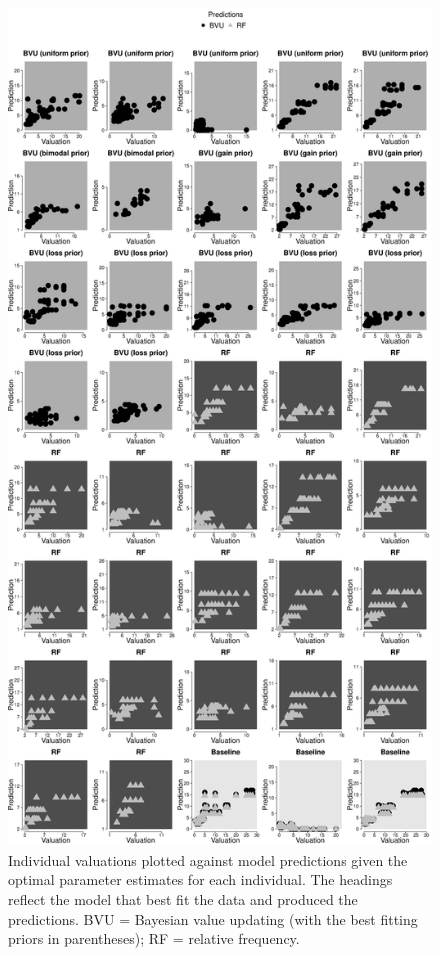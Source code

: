 \documentclass[a4paper, man, natbib, floatsintext]{apa6} %
\begin{document}
\begin{figure}[htbp] 
  \centering
\includegraphics[height = .8\textheight, keepaspectratio]{indqual2.eps}
  \caption{Individual valuations plotted against model predictions given the optimal parameter estimates for each individual. The headings reflect the model that best fit the data and produced the predictions. BVU = Bayesian value updating (with the best fitting priors in parentheses); RF = relative frequency.}
  \label{fig:ind.fits2}
\end{figure}
\end{document}
